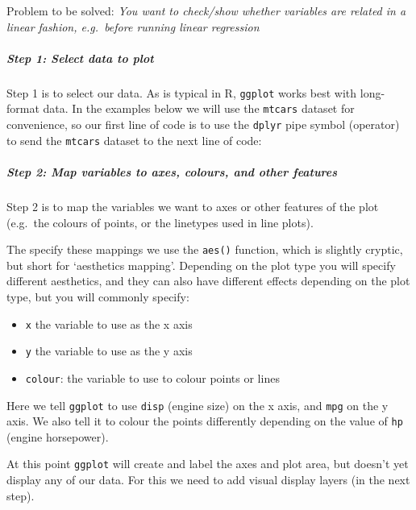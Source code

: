 \documentclass[]{article}
\newenvironment{Shaded}{\begin{snugshade}}{\end{snugshade}}
\newcommand{\StringTok}[1]{\textcolor[rgb]{0.31,0.60,0.02}{#1}}
\newcommand{\OperatorTok}[1]{\textcolor[rgb]{0.81,0.36,0.00}{\textbf{#1}}}
\newcommand{\NormalTok}[1]{#1}
\providecommand{\tightlist}{%
  \setlength{\itemsep}{0pt}\setlength{\parskip}{0pt}}
\let\oldsubparagraph\subparagraph
\renewcommand{\subparagraph}[1]{\oldsubparagraph{#1}\mbox{}}
\theoremstyle{definition}
\theoremstyle{definition}
\theoremstyle{definition}
\theoremstyle{remark}
\begin{document}
Problem to be solved: \emph{You want to check/show whether variables are
related in a linear fashion, e.g.~before running linear regression}

\subparagraph{Step 1: Select data to
plot}\label{step-1-select-data-to-plot}

Step 1 is to select our data. As is typical in R, \texttt{ggplot} works
best with long-format data. In the examples below we will use the
\texttt{mtcars} dataset for convenience, so our first line of code is to
use the \texttt{dplyr} pipe symbol (operator) to send the
\texttt{mtcars} dataset to the next line of code:

\begin{Shaded}
\end{Shaded}

\subparagraph{Step 2: Map variables to axes, colours, and other
features}\label{step-2-map-variables-to-axes-colours-and-other-features}

Step 2 is to map the variables we want to axes or other features of the
plot (e.g.~the colours of points, or the linetypes used in line plots).

The specify these mappings we use the \texttt{aes()} function, which is
slightly cryptic, but short for `aesthetics mapping'. Depending on the
plot type you will specify different aesthetics, and they can also have
different effects depending on the plot type, but you will commonly
specify:

\begin{itemize}
\tightlist
\item
  \texttt{x} the variable to use as the x axis
\item
  \texttt{y} the variable to use as the y axis
\item
  \texttt{colour}: the variable to use to colour points or lines
\end{itemize}

Here we tell \texttt{ggplot} to use \texttt{disp} (engine size) on the x
axis, and \texttt{mpg} on the y axis. We also tell it to colour the
points differently depending on the value of \texttt{hp} (engine
horsepower).

At this point \texttt{ggplot} will create and label the axes and plot
area, but doesn't yet display any of our data. For this we need to add
visual display layers (in the next step).
\end{document}
